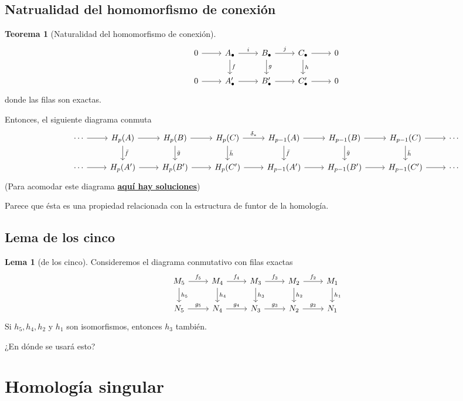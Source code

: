 \documentclass[spanish]{book}
\theoremstyle{definition}
\newtheorem*{lema}{Lema}
\newtheorem*{teo}{Teorema}
\begin{document}
\section{Natrualidad del homomorfismo de conexión}
\begin{teo}[Naturalidad del homomorfismo de conexión]
	\[\begin{tikzcd}
		&0\arrow{r}&A_\bullet\arrow{r}{i}\arrow{d}{f}&B_\bullet\arrow{r}{j}\arrow{d}{g}&C_\bullet\arrow{r}\arrow{d}{h}&0\\
		&0\arrow{r}&A'_\bullet\arrow{r}&B'_\bullet\arrow{r}&C'_\bullet\arrow{r}&0
	\end{tikzcd}\]
	donde las filas son exactas.\par
	Entonces, el siguiente diagrama conmuta
		\[\begin{tikzcd}
		&\cdots\arrow{r}&H_p(A)\arrow{r}\arrow{d}{\bar f}&H_p(B)\arrow{r}\arrow{d}{\bar g}&H_p(C)\arrow{r}{\delta_*}\arrow{d}{\bar h}&H_{p-1}(A)\arrow{r}\arrow{d}{\bar f}&H_{p-1}(B)\arrow{r}\arrow{d}{\bar g}&H_{p-1}(C)\arrow{r}\arrow{d}{\bar h}&\cdots\\
		&\cdots\arrow{r}&H_p(A')\arrow{r}&H_p(B')\arrow{r}&H_p(C')\arrow{r}&H_{p-1}(A')\arrow{r}&H_{p-1}(B')\arrow{r}&H_{p-1}(C')\arrow{r}&\cdots
		\end{tikzcd}\]
		(Para acomodar este diagrama \href{https://tex.stackexchange.com/questions/663056/wide-tikz-cd-diagram-not-centered-shifted-to-the-right}{\textbf{aquí hay soluciones}})
\end{teo}
Parece que ésta es una propiedad relacionada con la estructura de funtor de la homología.
\section{Lema de los cinco}
\begin{lema}[de los cinco]
	Consideremos el diagrama conmutativo con filas exactas
	\[\begin{tikzcd}
		M_5\arrow{r}{f_5}\arrow{d}{h_5}&M_4\arrow{r}{f_4}\arrow{d}{h_4}&M_3\arrow{r}{f_3}\arrow{d}{h_3}&M_2\arrow{r}{f_2}\arrow{d}{h_2}&M_1\arrow{d}{h_1}\\
		N_5\arrow{r}{g_5}&N_4\arrow{r}{g_4}&N_3\arrow{r}{g_3}&N_2\arrow{r}{g_2}&N_1
	\end{tikzcd}\]
	Si $h_5,h_4,h_2$ y $h_1$ son isomorfismos, entonces $h_3$ también.
\end{lema}
¿En dónde se usará esto?

\chapter{Homología singular}
\end{document}
